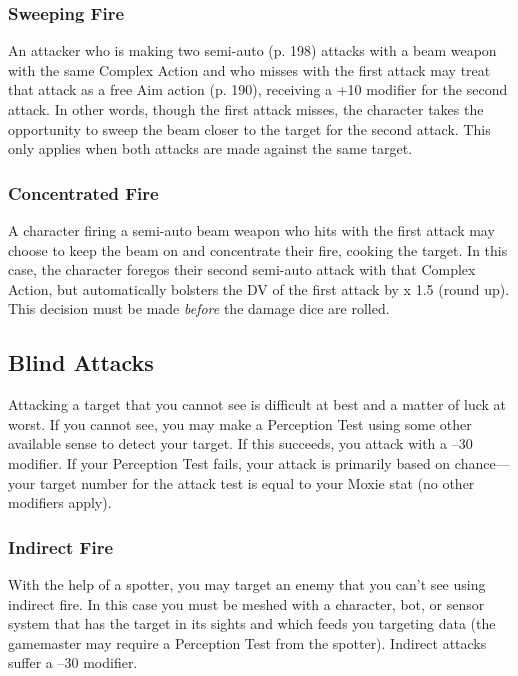 \subsubsection{Sweeping Fire}

An attacker who is making two semi-auto (p. 198) 
attacks with a beam weapon with the same Complex 
Action and who misses with the first attack may treat 
that attack as a free Aim action (p. 190), receiving a 
+10 modifier for the second attack. In other words, 
though the first attack misses, the character takes the 
opportunity to sweep the beam closer to the target 
for the second attack. This only applies when both 
attacks are made against the same target.

\subsubsection{Concentrated Fire}

A character firing a semi-auto beam 
weapon who hits with the first attack may 
choose to keep the beam on and concentrate
their fire, cooking the target. In this
case, the character foregos their second 
semi-auto attack with that Complex 
Action, but automatically bolsters the 
DV of the first attack by x 1.5 (round up). 
This decision must be made \textit{before  }the 
damage dice are rolled.

\subsection{Blind Attacks}

Attacking a target that you cannot see is 
difficult at best and a matter of luck at 
worst. If you cannot see, you may make a 
Perception Test using some other available 
sense to detect your target. If this succeeds, 
you attack with a –30 modifier. If your Perception
Test fails, your attack is primarily
based on chance—your target number for 
the attack test is equal to your Moxie stat 
(no other modifiers apply).

\subsubsection{Indirect Fire}

With the help of a spotter, you may target 
an enemy that you can't see using indirect 
fire. In this case you must be meshed with 
a character, bot, or sensor system that has 
the target in its sights and which feeds 
you targeting data (the gamemaster may 
require a Perception Test from the spotter). 
Indirect attacks suffer a –30 modifier.

